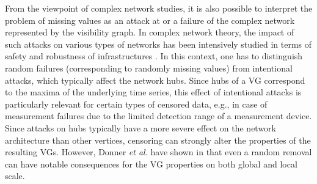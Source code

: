 		From the viewpoint of complex network studies, it is also possible to interpret the problem of missing values as an attack at or a failure of the complex network represented by the visibility graph. In complex network theory, the impact of such attacks on various types of networks has been intensively studied in terms of safety and robustness of infrastructures \cite{Albert2002}. In this context, one has to distinguish random failures (corresponding to randomly missing values) from intentional attacks, which typically affect the network hubs. Since hubs of a VG correspond to the maxima of the underlying time series, this effect of intentional attacks is particularly relevant for certain types of censored data, e.g., in case of measurement failures due to the limited detection range of a measurement device. Since attacks on hubs typically have a more severe effect on the network architecture than other vertices, censoring can strongly alter the properties of the resulting VGs. However, Donner {\textit{et al.}} have shown in \cite{Donner2012} that even a random removal can have notable consequences for the VG properties on both global and local scale. 
		
